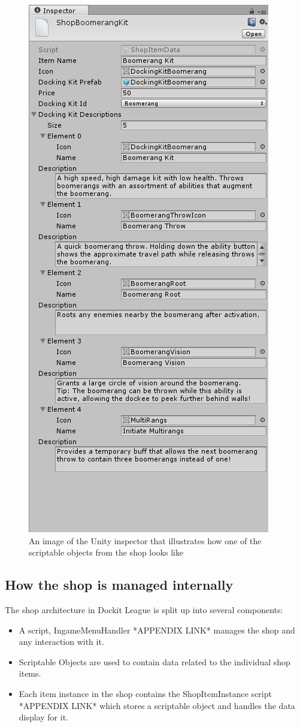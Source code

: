 \begin{figure}[tbph]
  \centering
  \includegraphics[width=.6\textwidth]{images/scriptableObjectInspector}
  \caption[Image of the Unity inspector showing scriptable objects from the shop]{An image of the Unity inspector that illustrates how one of the scriptable objects from the shop looks like}
  \label{fig:scriptableObjectInspectorShop}
\end{figure}

\subsection{How the shop is managed internally}
The shop architecture in Dockit League is split up into several components:
\begin{itemize}
    \item A script, IngameMenuHandler *APPENDIX LINK* manages the shop and any interaction with it.
    \item Scriptable Objects are used to contain data related to the individual shop items. 
    \item Each item instance in the shop contains the ShopItemInstance script *APPENDIX LINK* which stores a scriptable object and handles the data display for it. 
\end{itemize}

